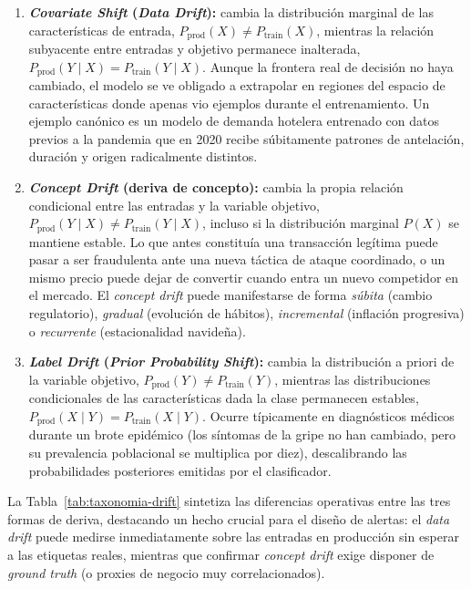 \begin{enumerate}
  \item \textbf{\textit{Covariate Shift} (\textit{Data Drift}):} cambia la distribución marginal de las características de entrada, $P_{\text{prod}}(X) \neq P_{\text{train}}(X)$, mientras la relación subyacente entre entradas y objetivo permanece inalterada, $P_{\text{prod}}(Y \mid X) = P_{\text{train}}(Y \mid X)$. Aunque la frontera real de decisión no haya cambiado, el modelo se ve obligado a extrapolar en regiones del espacio de características donde apenas vio ejemplos durante el entrenamiento. Un ejemplo canónico es un modelo de demanda hotelera entrenado con datos previos a la pandemia que en 2020 recibe súbitamente patrones de antelación, duración y origen radicalmente distintos.
  \item \textbf{\textit{Concept Drift} (deriva de concepto):} cambia la propia relación condicional entre las entradas y la variable objetivo, $P_{\text{prod}}(Y \mid X) \neq P_{\text{train}}(Y \mid X)$, incluso si la distribución marginal $P(X)$ se mantiene estable. Lo que antes constituía una transacción legítima puede pasar a ser fraudulenta ante una nueva táctica de ataque coordinado, o un mismo precio puede dejar de convertir cuando entra un nuevo competidor en el mercado. El \textit{concept drift} puede manifestarse de forma \textit{súbita} (cambio regulatorio), \textit{gradual} (evolución de hábitos), \textit{incremental} (inflación progresiva) o \textit{recurrente} (estacionalidad navideña).
  \item \textbf{\textit{Label Drift} (\textit{Prior Probability Shift}):} cambia la distribución a priori de la variable objetivo, $P_{\text{prod}}(Y) \neq P_{\text{train}}(Y)$, mientras las distribuciones condicionales de las características dada la clase permanecen estables, $P_{\text{prod}}(X \mid Y) = P_{\text{train}}(X \mid Y)$. Ocurre típicamente en diagnósticos médicos durante un brote epidémico (los síntomas de la gripe no han cambiado, pero su prevalencia poblacional se multiplica por diez), descalibrando las probabilidades posteriores emitidas por el clasificador.
\end{enumerate}

La Tabla~\ref{tab:taxonomia-drift} sintetiza las diferencias operativas entre las tres formas de deriva, destacando un hecho crucial para el diseño de alertas: el \textit{data drift} puede medirse inmediatamente sobre las entradas en producción sin esperar a las etiquetas reales, mientras que confirmar \textit{concept drift} exige disponer de \textit{ground truth} (o proxies de negocio muy correlacionados).

